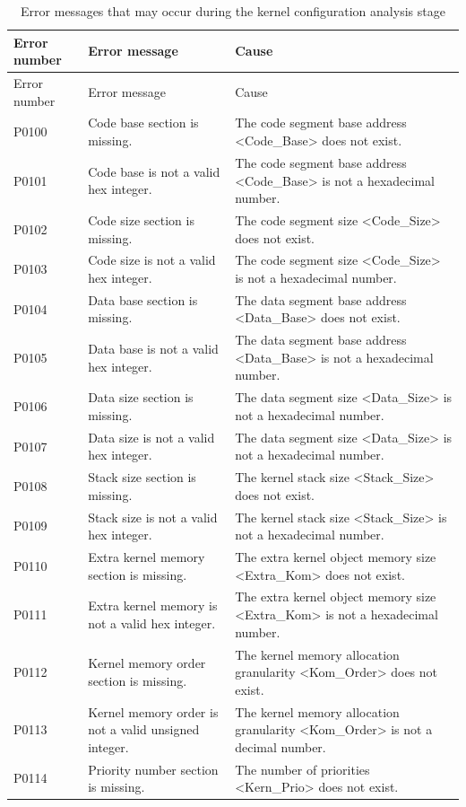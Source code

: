 \begin{xltabular}{\textwidth}{@{}>{\hsize\raggedright\arraybackslash}X>{\hsize\raggedright\arraybackslash}X>{\hsize\raggedright\arraybackslash}X@{}}
\caption{Error messages that may occur during the kernel configuration analysis stage}\label{tab:5-4}\\
\toprule
Error number & Error message & Cause\tabularnewline
\endfirsthead
\toprule
Error number & Error message & Cause\tabularnewline
\midrule
\endhead
\bottomrule
\endlastfoot
P0100 & Code base section is missing. &
The code segment base address <Code\_\allowbreak{}Base> does not exist.\tabularnewline
P0101 & Code base is not a valid hex integer. &
The code segment base address <Code\_\allowbreak{}Base> is not a hexadecimal number.\tabularnewline
P0102 & Code size section is missing. &
The code segment size <Code\_\allowbreak{}Size> does not exist.\tabularnewline
P0103 & Code size is not a valid hex integer. &
The code segment size <Code\_\allowbreak{}Size> is not a hexadecimal number.\tabularnewline
P0104 & Data base section is missing. &
The data segment base address <Data\_\allowbreak{}Base> does not exist.\tabularnewline
P0105 & Data base is not a valid hex integer. &
The data segment base address <Data\_\allowbreak{}Base> is not a hexadecimal number.\tabularnewline
P0106 & Data size section is missing. &
The data segment size <Data\_\allowbreak{}Size> is not a hexadecimal number.\tabularnewline
P0107 & Data size is not a valid hex integer. &
The data segment size <Data\_\allowbreak{}Size> is not a hexadecimal number.\tabularnewline
P0108 & Stack size section is missing. &
The kernel stack size <Stack\_\allowbreak{}Size> does not exist.\tabularnewline
P0109 & Stack size is not a valid hex integer. &
The kernel stack size <Stack\_\allowbreak{}Size> is not a hexadecimal number.\tabularnewline
P0110 & Extra kernel memory section is missing. &
The extra kernel object memory size <Extra\_\allowbreak{}Kom> does not exist.\tabularnewline
P0111 & Extra kernel memory is not a valid hex integer. &
The extra kernel object memory size <Extra\_\allowbreak{}Kom> is not a hexadecimal number.\tabularnewline
P0112 & Kernel memory order section is missing. &
The kernel memory allocation granularity <Kom\_\allowbreak{}Order> does not exist.\tabularnewline
P0113 & Kernel memory order is not a valid unsigned integer. &
The kernel memory allocation granularity <Kom\_\allowbreak{}Order> is not a decimal number.\tabularnewline
P0114 & Priority number section is missing. &
The number of priorities <Kern\_\allowbreak{}Prio> does not exist.\tabularnewline

\end{xltabular}
